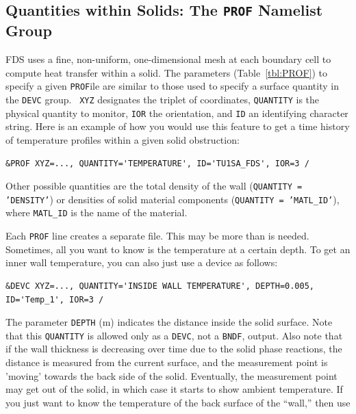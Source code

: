 \documentclass[11pt]{book}
\newcommand{\ct}{\tt\small}
\begin{document}
\subsection{Quantities within Solids: The \texorpdfstring{{\tt PROF}}{PROF} Namelist Group}
\label{info:PROF}

FDS uses a fine, non-uniform, one-dimensional mesh at each boundary
cell to compute heat transfer within a solid. The parameters
(Table~\ref{tbl:PROF}) to specify a given {\ct PROF}ile are similar to
those used to specify a surface quantity in the {\ct DEVC} group. {\ct
XYZ} designates the triplet of coordinates, {\ct QUANTITY} is the
physical quantity to monitor, {\ct IOR} the orientation,
and {\ct ID} an identifying character string. Here is an example of
how you would use this feature to get a time history of temperature
profiles within a given solid obstruction:

\footnotesize
\begin{verbatim}
&PROF XYZ=..., QUANTITY='TEMPERATURE', ID='TU1SA_FDS', IOR=3 /
\end{verbatim} \normalsize

\noindent
Other possible quantities are the total density of the wall ({\ct QUANTITY = 'DENSITY'}) or densities of
solid material components ({\ct QUANTITY = 'MATL\_ID'}), where {\ct MATL\_ID} is the name of the
material.

Each {\ct PROF} line creates a separate file. This may be more than is
needed. Sometimes, all you want to know is the temperature at a
certain depth. To get an inner wall temperature, you can also just use
a device as follows:

\footnotesize
\begin{verbatim}
&DEVC XYZ=..., QUANTITY='INSIDE WALL TEMPERATURE', DEPTH=0.005, ID='Temp_1', IOR=3 /
\end{verbatim} \normalsize

\noindent
The parameter {\ct DEPTH} (m) indicates the distance inside the solid surface.
Note that this {\ct QUANTITY} is allowed only as a {\ct DEVC}, not a
{\ct BNDF}, output. Also note that if the wall thickness is decreasing
over time due to the solid phase reactions, the distance is
measured from the current surface, and the measurement point is
'moving' towards the back side of the solid. Eventually, the
measurement point may get out of the solid, in which case it starts to
show ambient temperature. If you just want to know the temperature of the back surface
of the ``wall,'' then use
\end{document}
